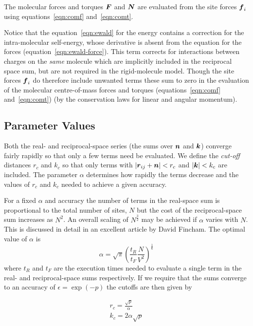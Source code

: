 \documentclass[twoside]{report}
\newcommand{\bm}[1]{\mbox{\boldmath \protect\(#1\protect\)}}
\begin{document}
The molecular forces and torques $\bm{F}$ and $\bm{N}$ are evaluated
from the site forces $\bm{f}_i$ using equations~\ref{eqn:comf} 
and~\ref{eqn:comt}.

Notice that the equation~\ref{eqn:ewald} for the energy contains a
correction for the intra-molecular self-energy, whose derivative is
absent from the equation for the forces
(equation~\ref{eqn:ewald-force}).  This term corrects for interactions
between charges on the {\em same\/} molecule which are implicitly
included in the reciprocal space sum, but are not required in the
rigid-molecule model.  Though the site forces $\bm{f}_i$ do therefore
include unwanted terms these sum to zero in the evaluation of the
molecular centre-of-mass forces and torques (equations~\ref{eqn:comf}
and~\ref{eqn:comt}) (by the conservation laws for linear and angular
momentum).

\subsection{Parameter Values}
\label{sec:ewald-auto}

Both the real- and reciprocal-space series (the sums over $\bm{n}$ and
$\bm{k}$) converge fairly rapidly so that only a few terms need be
evaluated.  We define the {\em cut-off\/} distances $r_c$ and $k_c$ so
that only terms with $| \bm{r}_{ij} +\bm{n} | < r_c$ and $|\bm{k}| < k_c$
are included.  The parameter $\alpha$ determines how rapidly the terms
decrease and the values of $r_c$ and $k_c$ needed to achieve a given
accuracy. 

For a fixed $\alpha$ and accuracy the number of terms in the
real-space sum is proportional to the total number of sites, $N$ but
the cost of the reciprocal-space sum increases as $N^2$. An overall
scaling of $N^\frac{3}{2}$ may be achieved if $\alpha$ varies with
$N$. This is discussed in detail in an excellent article by David
Fincham\cite{fincham:93}.  The optimal value of $\alpha$ is
%
\begin{equation}
\alpha = \sqrt{\pi} \left ( \frac{t_R}{t_F} \frac{N}{V^2}\right )
^\frac{1}{6} 
\label{eqn:ewald-alpha}
\end{equation}
%
where $t_R$ and $t_F$ are the execution times needed to evaluate a
single term in the real- and reciprocal-space sums respectively.
If we require that the sums converge to an accuracy of $ \epsilon =
\exp ( -p )$ the cutoffs are then given by

\begin{eqnarray}
r_c  = \frac{\sqrt{p}}{\alpha} \\
k_c = 2 \alpha \sqrt{p}
\label{eqn:ewald-cut}
\end{eqnarray}
\end{document}
